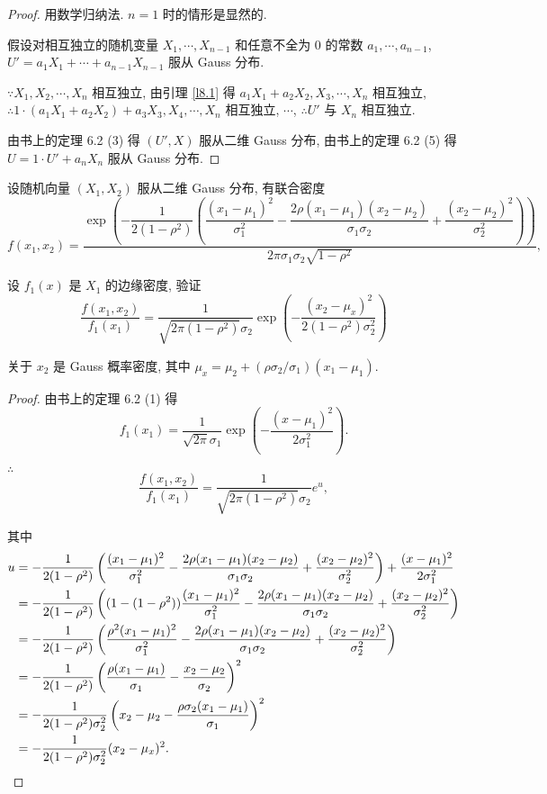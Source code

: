 \documentclass{ctexart}
\begin{document}
\begin{proof}
    用数学归纳法. $n=1$ 时的情形是显然的.

    假设对相互独立的随机变量 $X_1,\cdots,X_{n-1}$ 和任意不全为 $0$ 的常数 $a_1,\cdots,a_{n-1}$, $U'=a_1X_1+\cdots+a_{n-1}X_{n-1}$ 服从 Gauss 分布.

    $\because X_1,X_2,\cdots,X_n$ 相互独立, 由引理 \ref{l8.1} 得 $a_1X_1+a_2X_2,X_3,\cdots,X_n$ 相互独立, $\therefore 1\cdot(a_1X_1+a_2X_2)+a_3X_3,X_4,\cdots,X_n$ 相互独立, $\cdots$, $\therefore U'$ 与 $X_n$ 相互独立.

    由书上的定理 6.2 (3) 得 $(U',X)$ 服从二维 Gauss 分布, 由书上的定理 6.2 (5) 得 $U=1\cdot U'+a_nX_n$ 服从 Gauss 分布.
\end{proof}
\begin{exercise}[b]%
    设随机向量 $(X_1,X_2)$ 服从二维 Gauss 分布, 有联合密度
    \[f(x_1,x_2)=\dfrac{\exp\left(-\dfrac{1}{2(1-\rho^2)}\left(\dfrac{(x_1-\mu_1)^2}{\sigma_1^2}-\dfrac{2\rho(x_1-\mu_1)(x_2-\mu_2)}{\sigma_1\sigma_2}+\dfrac{(x_2-\mu_2)^2}{\sigma_2^2}\right)\right)}{2\pi\sigma_1\sigma_2\sqrt{1-\rho^2}},\]

    设 $f_1(x)$ 是 $X_1$ 的边缘密度, 验证
    \[\dfrac{f(x_1,x_2)}{f_1(x_1)}=\dfrac{1}{\sqrt{2\pi(1-\rho^2)}\sigma_2}\exp\left(-\dfrac{(x_2-\mu_x)^2}{2(1-\rho^2)\sigma_2^2}\right)\]

    关于 $x_2$ 是 Gauss 概率密度, 其中 $\mu_x=\mu_2+(\rho\sigma_2/\sigma_1)(x_1-\mu_1)$.
\end{exercise}
\begin{proof}
    由书上的定理 6.2 (1) 得
    \[f_1(x_1)=\dfrac{1}{\sqrt{2\pi}\sigma_1}\exp\left(-\dfrac{(x-\mu_1)^2}{2\sigma_1^2}\right).\]

    $\therefore$
    \[\dfrac{f(x_1,x_2)}{f_1(x_1)}=\dfrac{1}{\sqrt{2\pi(1-\rho^2)}\sigma_2}e^u,\]

    其中
    \begin{align*}
        u & =-\dfrac{1}{2(1-\rho^2)}\left(\dfrac{(x_1-\mu_1)^2}{\sigma_1^2}-\dfrac{2\rho(x_1-\mu_1)(x_2-\mu_2)}{\sigma_1\sigma_2}+\dfrac{(x_2-\mu_2)^2}{\sigma_2^2}\right)+\dfrac{(x-\mu_1)^2}{2\sigma_1^2} \\
        & =-\dfrac{1}{2(1-\rho^2)}\left((1-(1-\rho^2))\dfrac{(x_1-\mu_1)^2}{\sigma_1^2}-\dfrac{2\rho(x_1-\mu_1)(x_2-\mu_2)}{\sigma_1\sigma_2}+\dfrac{(x_2-\mu_2)^2}{\sigma_2^2}\right) \\
        & =-\dfrac{1}{2(1-\rho^2)}\left(\dfrac{\rho^2(x_1-\mu_1)^2}{\sigma_1^2}-\dfrac{2\rho(x_1-\mu_1)(x_2-\mu_2)}{\sigma_1\sigma_2}+\dfrac{(x_2-\mu_2)^2}{\sigma_2^2}\right) \\
        & =-\dfrac{1}{2(1-\rho^2)}\left(\dfrac{\rho(x_1-\mu_1)}{\sigma_1}-\dfrac{x_2-\mu_2}{\sigma_2}\right)^2 \\
        & =-\dfrac{1}{2(1-\rho^2)\sigma_2^2}\left(x_2-\mu_2-\dfrac{\rho\sigma_2(x_1-\mu_1)}{\sigma_1}\right)^2 \\
        & =-\dfrac{1}{2(1-\rho^2)\sigma_2^2}(x_2-\mu_x)^2.\qedhere
    \end{align*}
\end{proof}
\end{document}
